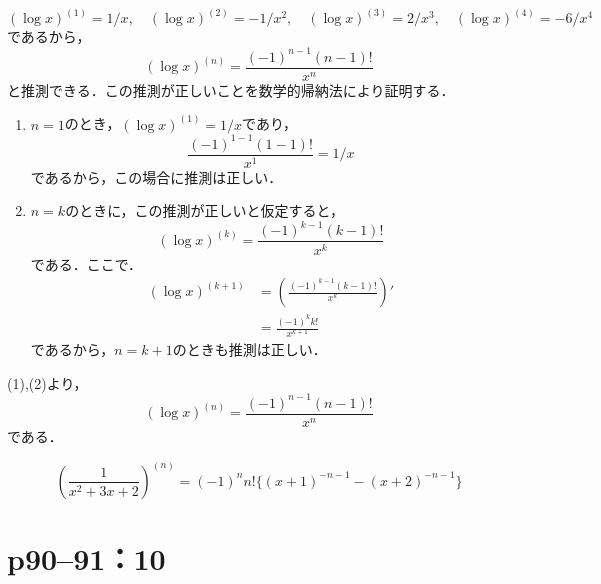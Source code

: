 \documentclass[a4paper,10pt,fleqn]{ltjsarticle}
\begin{document}
\begin{tleftbar}
    \[
        ( \log x )^{(1)}= 1/x , \quad (\log x)^{(2)} = - 1/x^2 , \quad (\log x)^{(3)} = 2/x^3,\quad (\log x)^{(4)} = - 6 /x^4
    \]
    であるから，
    \[
        (\log x)^{(n)} = \frac{(-1)^{n-1}  (n-1)!}{x^n}
    \]
    と推測できる．この推測が正しいことを数学的帰納法により証明する．
    \begin{enumerate}
        \item $n=1$のとき，$(\log x)^{(1)} = 1/x$であり，
              \[
                  \frac{(-1)^{1-1}  (1-1)!}{x^1}=1/x
              \]
              であるから，この場合に推測は正しい．
        \item $n=k$のときに，この推測が正しいと仮定すると，
              \[
                  (\log x)^{(k)} = \frac{(-1)^{k-1}  (k-1)!}{x^k}
              \]
              である．ここで．
              \begin{align*}
                  (\log x)^{(k+1)} & = \left (\frac{(-1)^{k-1}  (k-1)!}{x^k} \right ) ' \\
                                   & = \frac{(-1)^k  k!}{x^{k+1}}
              \end{align*}
              であるから，$n=k+1$のときも推測は正しい．
    \end{enumerate}
    (1),(2)より，
    \[
        (\log x)^{(n)} = \frac{(-1)^{n-1}  (n-1)!}{x^n}
    \]
    である．
\end{tleftbar}

\begin{tleftbar}
    \[
        \left(   \frac{1}{x^2+3x+2} \right)^{(n)} = (-1)^n n! \{ (x+1)^{-n-1} - (x+2)^{-n-1} \}
    \]
\end{tleftbar}



\section*{p90--91：10}
\end{document}
